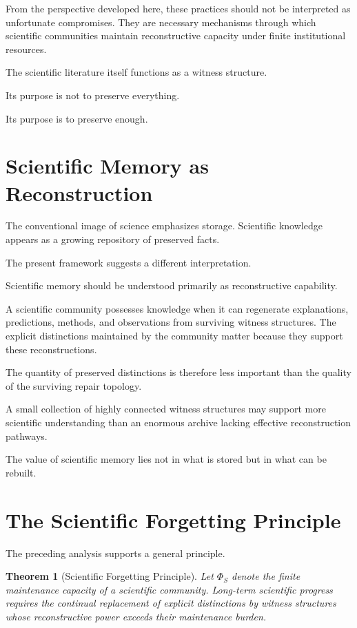 \documentclass[12pt,oneside]{book}
\theoremstyle{plain} \newtheorem{theorem}{Theorem}[chapter] \newtheorem{lemma}[theorem]{Lemma} \newtheorem{proposition}[theorem]{Proposition} \newtheorem{corollary}[theorem]{Corollary}
\theoremstyle{definition} \newtheorem{definition}[theorem]{Definition} \newtheorem{axiom}[theorem]{Axiom} \newtheorem{construction}[theorem]{Construction}
\theoremstyle{remark} \newtheorem{remark}[theorem]{Remark} \newtheorem{example}[theorem]{Example}
\begin{document}
From the perspective developed here, these practices should not be interpreted as unfortunate compromises. They are necessary mechanisms through which scientific communities maintain reconstructive capacity under finite institutional resources.

The scientific literature itself functions as a witness structure.

Its purpose is not to preserve everything.

Its purpose is to preserve enough.

\section{Scientific Memory as Reconstruction}

The conventional image of science emphasizes storage. Scientific knowledge appears as a growing repository of preserved facts.

The present framework suggests a different interpretation.

Scientific memory should be understood primarily as reconstructive capability.

A scientific community possesses knowledge when it can regenerate explanations, predictions, methods, and observations from surviving witness structures. The explicit distinctions maintained by the community matter because they support these reconstructions.

The quantity of preserved distinctions is therefore less important than the quality of the surviving repair topology.

A small collection of highly connected witness structures may support more scientific understanding than an enormous archive lacking effective reconstruction pathways.

The value of scientific memory lies not in what is stored but in what can be rebuilt.

\section{The Scientific Forgetting Principle}

The preceding analysis supports a general principle.

\begin{theorem}[Scientific Forgetting Principle]

Let $\Phi_S$ denote the finite maintenance capacity of a scientific community. Long-term scientific progress requires the continual replacement of explicit distinctions by witness structures whose reconstructive power exceeds their maintenance burden.

\end{theorem}
\end{document}

